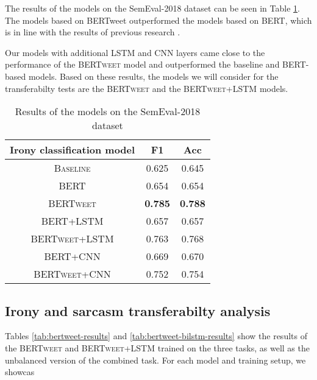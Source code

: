 \documentclass[10pt, a4paper]{article}
\begin{document}
The results of the models on the SemEval-2018 dataset can be seen in Table \ref{tab:semeval-2018}. The models based on
BERTweet outperformed the models based on BERT, which is in line with the results of previous research \citep{bertweet}.

Our models with additional LSTM and CNN layers came close to the performance of the \textsc{BERTweet} model and outperformed
the baseline and BERT-based models. Based on these results, the models we will consider for the transferabilty tests are the
\textsc{BERTweet} and the \textsc{BERTweet+LSTM} models.

\begin{table}[h]
   \caption{Results of the models on the SemEval-2018 dataset}
   \label{tab:semeval-2018}
   \begin{center}
   \begin{tabular}{|c|c|c|}
   \toprule
   Irony classification model & F1 & Acc\\
   \midrule
   \textsc{Baseline} & 0.625 & 0.645 \\
   \textsc{BERT} & 0.654 & 0.654 \\
   \textsc{BERTweet} & \textbf{0.785} & \textbf{0.788} \\
   \textsc{BERT+LSTM} & 0.657 & 0.657 \\
   \textsc{BERTweet+LSTM} & 0.763 & 0.768 \\
   \textsc{BERT+CNN} & 0.669 & 0.670 \\
   \textsc{BERTweet+CNN} & 0.752 & 0.754 \\
   \bottomrule
   \end{tabular}
   \end{center}
\end{table}

\subsection{Irony and sarcasm transferabilty analysis}\label{task-analysis}

Tables \ref{tab:bertweet-results} and \ref{tab:bertweet-bilstm-results} show the results of the \textsc{BERTweet} and
\textsc{BERTweet+LSTM} trained on the three tasks, as well as the unbalanced version of the combined task. For each model
and training setup, we showcas
\end{document}
